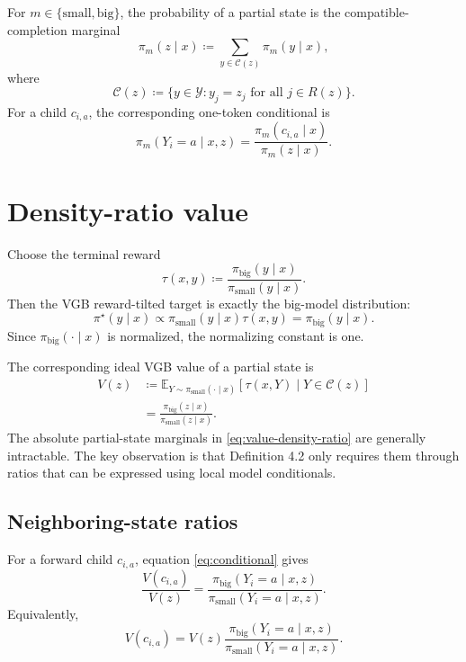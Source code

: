 \documentclass[11pt]{article}
\newcommand{\pb}{\pi_{\mathrm{big}}}
\newcommand{\ps}{\pi_{\mathrm{small}}}
\newcommand{\Y}{\mathcal{Y}}
\newcommand{\R}{R}
\begin{document}
For $m\in\{\mathrm{small},\mathrm{big}\}$, the probability of a partial state is the compatible-completion marginal
\begin{equation}
\pi_m(z\mid x)
\coloneqq
\sum_{y\in\mathcal C(z)} \pi_m(y\mid x),
\end{equation}
where
\begin{equation}
\mathcal C(z)
\coloneqq
\{y\in\Y : y_j=z_j \text{ for all }j\in\R(z)\}.
\end{equation}
For a child $c_{i,a}$, the corresponding one-token conditional is
\begin{equation}
\pi_m(Y_i=a\mid x,z)
=
\frac{\pi_m(c_{i,a}\mid x)}{\pi_m(z\mid x)}.
\label{eq:conditional}
\end{equation}

\section{Density-ratio value}

Choose the terminal reward
\begin{equation}
\tau(x,y)
\coloneqq
\frac{\pb(y\mid x)}{\ps(y\mid x)}.
\end{equation}
Then the VGB reward-tilted target is exactly the big-model distribution:
\begin{equation}
\pi^\star(y\mid x)
\propto
\ps(y\mid x)\tau(x,y)
=
\pb(y\mid x).
\end{equation}
Since $\pb(\cdot\mid x)$ is normalized, the normalizing constant is one.

The corresponding ideal VGB value of a partial state is
\begin{align}
V(z)
&\coloneqq
\mathbb E_{Y\sim\ps(\cdot\mid x)}
\left[\tau(x,Y)\mid Y\in\mathcal C(z)\right] \\
&=
\frac{\pb(z\mid x)}{\ps(z\mid x)}.
\label{eq:value-density-ratio}
\end{align}
The absolute partial-state marginals in \eqref{eq:value-density-ratio} are generally intractable. The key observation is that Definition 4.2 only requires them through ratios that can be expressed using local model conditionals.

\subsection{Neighboring-state ratios}

For a forward child $c_{i,a}$, equation \eqref{eq:conditional} gives
\begin{equation}
\frac{V(c_{i,a})}{V(z)}
=
\frac{\pb(Y_i=a\mid x,z)}{\ps(Y_i=a\mid x,z)}.
\label{eq:forward-value-ratio}
\end{equation}
Equivalently,
\begin{equation}
V(c_{i,a})
=
V(z)
\frac{\pb(Y_i=a\mid x,z)}{\ps(Y_i=a\mid x,z)}.
\end{equation}
\end{document}

